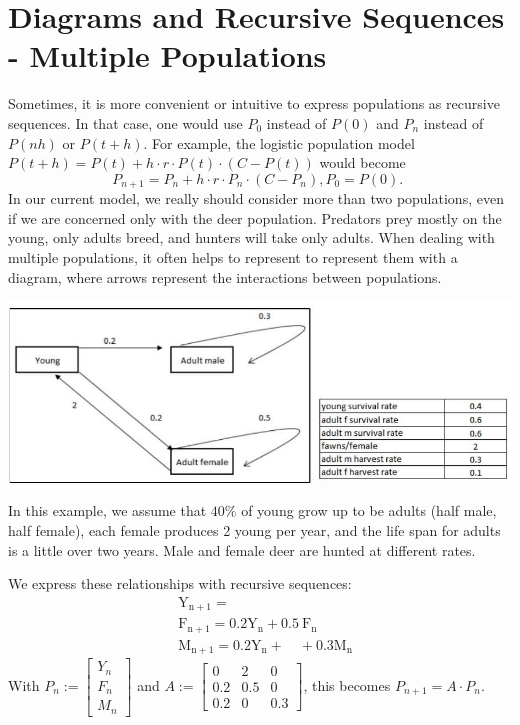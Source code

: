 \documentclass[10pt]{article}
\begin{document}
\section{Diagrams and Recursive Sequences - Multiple Populations}
Sometimes, it is more convenient or intuitive to express populations as recursive sequences. In that case, one would use $P_{0}$ instead of $P(0)$ and $P_{n}$ instead of $P(n h)$ or $P(t+h)$. For example, the logistic population model $P(t+h)=P(t)+h \cdot r \cdot P(t) \cdot(C-P(t))$ would become
$$
P_{n+1}=P_{n}+h \cdot r \cdot P_{n} \cdot\left(C-P_{n}\right), P_{0}=P(0) \text {. }
$$
In our current model, we really should consider more than two populations, even if we are concerned only with the deer population. Predators prey mostly on the young, only adults breed, and hunters will take only adults. When dealing with multiple populations, it often helps to represent to represent them with a diagram, where arrows represent the interactions between populations.

\includegraphics[max width=\textwidth]{2022_07_05_5945264bba2a5f6ba667g-16}

In this example, we assume that $40 \%$ of young grow up to be adults (half male, half female), each female produces 2 young per year, and the life span for adults is a little over two years. Male and female deer are hunted at different rates.

We express these relationships with recursive sequences:
$$
\begin{aligned}
&\mathrm{Y}_{\mathrm{n}+1}= \\
&\mathrm{F}_{\mathrm{n}+1}=0.2 \mathrm{Y}_{\mathrm{n}}+0.5 \mathrm{~F}_{\mathrm{n}} \\
&\mathrm{M}_{\mathrm{n}+1}=0.2 \mathrm{Y}_{\mathrm{n}}+\quad+0.3 \mathrm{M}_{\mathrm{n}}
\end{aligned}
$$
With $P_{n}:=\left[\begin{array}{c}Y_{n} \\ F_{n} \\ M_{n}\end{array}\right]$ and $A:=\left[\begin{array}{ccc}0 & 2 & 0 \\ 0.2 & 0.5 & 0 \\ 0.2 & 0 & 0.3\end{array}\right]$, this becomes $P_{n+1}=A \cdot P_{n}$.
\end{document}
